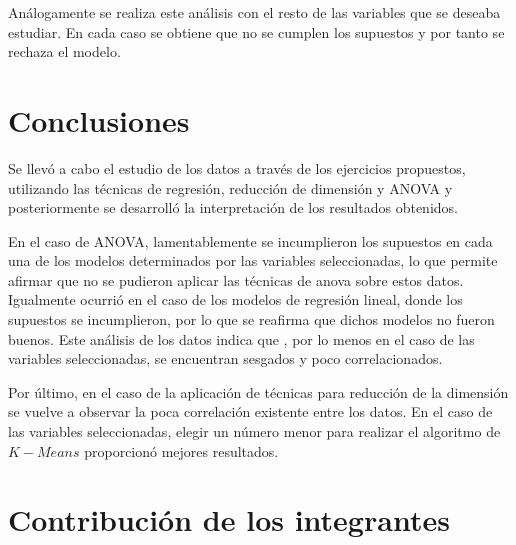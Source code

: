 \documentclass[a4paper,10pt,twocolumn]{article}
\begin{document}
Análogamente se realiza este análisis con el resto de las variables que se deseaba estudiar. En cada caso se obtiene que no se cumplen los supuestos y por tanto se rechaza el modelo.


  	




\section{Conclusiones}\label{sec:conc}

Se llevó a cabo el estudio de los datos a través de los ejercicios propuestos, utilizando las técnicas de regresión, reducción de dimensión y ANOVA y posteriormente se desarrolló la interpretación de los resultados obtenidos.

En el caso de ANOVA, lamentablemente se incumplieron los supuestos en cada una de los modelos determinados por las variables seleccionadas, lo que permite afirmar que no se pudieron aplicar las técnicas de anova sobre estos datos. Igualmente ocurrió en el caso de los modelos de regresión lineal, donde los supuestos se incumplieron, por lo que se reafirma que dichos modelos no fueron buenos. Este análisis de los datos indica que , por lo menos en el caso de las variables seleccionadas, se encuentran sesgados y poco correlacionados.

Por último, en el caso de la aplicación de técnicas para reducción de la dimensión se vuelve a observar la poca correlación existente entre los datos. En el caso de las variables seleccionadas, elegir un número menor para realizar el algoritmo de $K-Means$ proporcionó mejores resultados.


\section{Contribución de los integrantes}
\end{document}

